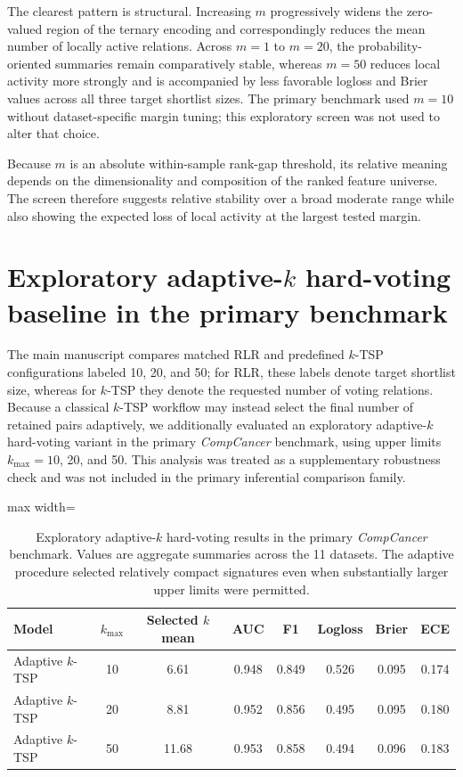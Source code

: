 \documentclass[11pt, a4paper]{article}
\newcommand{\stdtablefont}{\small}
\newcommand{\stdtablelayout}{%
  \stdtablefont
  \setlength{\tabcolsep}{4pt}
  \renewcommand{\arraystretch}{1.2}
}
\begin{document}
The clearest pattern is structural. Increasing $m$ progressively widens the zero-valued region of the ternary encoding and correspondingly reduces the mean number of locally active relations. Across $m=1$ to $m=20$, the probability-oriented summaries remain comparatively stable, whereas $m=50$ reduces local activity more strongly and is accompanied by less favorable logloss and Brier values across all three target shortlist sizes. The primary benchmark used $m=10$ without dataset-specific margin tuning; this exploratory screen was not used to alter that choice.

Because $m$ is an absolute within-sample rank-gap threshold, its relative meaning depends on the dimensionality and composition of the ranked feature universe. The screen therefore suggests relative stability over a broad moderate range while also showing the expected loss of local activity at the largest tested margin.


\section{Exploratory adaptive-$k$ hard-voting baseline in the primary benchmark}

The main manuscript compares matched RLR and predefined $k$-TSP configurations labeled 10, 20, and 50; for RLR, these labels denote target shortlist size, whereas for $k$-TSP they denote the requested number of voting relations. Because a classical $k$-TSP workflow may instead select the final number of retained pairs adaptively, we additionally evaluated an exploratory adaptive-$k$ hard-voting variant in the primary \emph{CompCancer} benchmark, using upper limits $k_{\max}=10$, 20, and 50. This analysis was treated as a supplementary robustness check and was not included in the primary inferential comparison family.

\begin{table}[!htbp]
\centering
\caption{Exploratory adaptive-$k$ hard-voting results in the primary \emph{CompCancer} benchmark. Values are aggregate summaries across the 11 datasets. The adaptive procedure selected relatively compact signatures even when substantially larger upper limits were permitted.}
\label{tab:adaptive_ktsp_world}
{\stdtablelayout
\begin{adjustbox}{max width=\linewidth}
\begin{tabular}{lccccccc}
\toprule
\textbf{Model} &
\textbf{$k_{\max}$} &
\textbf{Selected $k$ mean} &
\textbf{AUC} &
\textbf{F1} &
\textbf{Logloss} &
\textbf{Brier} &
\textbf{ECE} \\
\midrule
Adaptive $k$-TSP & 10 & 6.61  & 0.948 & 0.849 & 0.526 & 0.095 & 0.174 \\
Adaptive $k$-TSP & 20 & 8.81  & 0.952 & 0.856 & 0.495 & 0.095 & 0.180 \\
Adaptive $k$-TSP & 50 & 11.68 & 0.953 & 0.858 & 0.494 & 0.096 & 0.183 \\
\bottomrule
\end{tabular}
\end{adjustbox}
}
\end{table}
\end{document}
